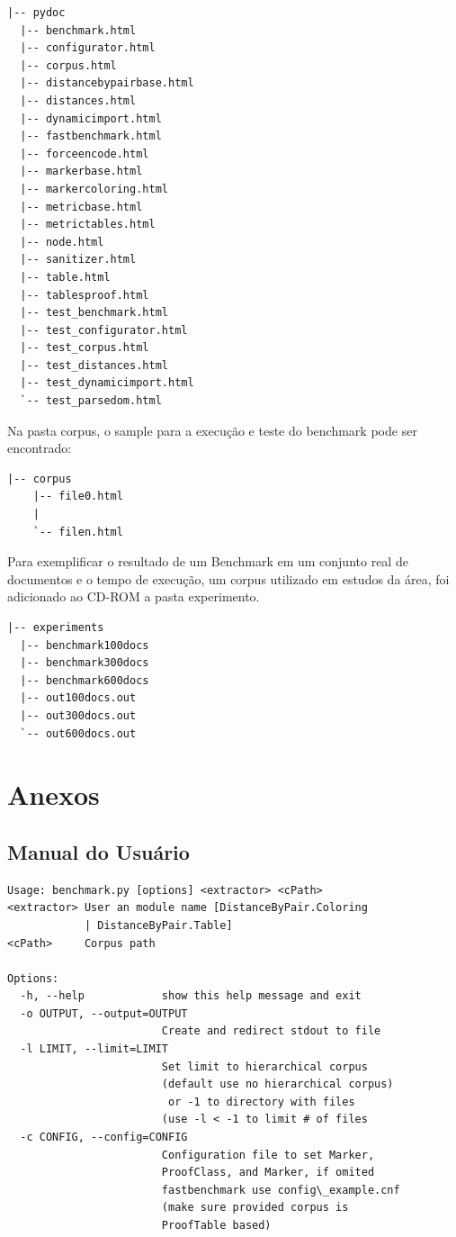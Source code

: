 \documentclass[12pt, a4paper]{article}
\begin{document}
\begin{verbatim}
|-- pydoc
  |-- benchmark.html
  |-- configurator.html
  |-- corpus.html
  |-- distancebypairbase.html
  |-- distances.html
  |-- dynamicimport.html
  |-- fastbenchmark.html
  |-- forceencode.html
  |-- markerbase.html
  |-- markercoloring.html
  |-- metricbase.html
  |-- metrictables.html
  |-- node.html
  |-- sanitizer.html
  |-- table.html
  |-- tablesproof.html
  |-- test_benchmark.html
  |-- test_configurator.html
  |-- test_corpus.html
  |-- test_distances.html
  |-- test_dynamicimport.html
  `-- test_parsedom.html

\end{verbatim}

Na pasta corpus, o sample para a execução e teste do benchmark pode ser
encontrado:

\begin{verbatim}
|-- corpus
    |-- file0.html 
    |
    `-- filen.html
\end{verbatim}

Para exemplificar o resultado de um Benchmark em um conjunto real de
documentos e o tempo de execução, um corpus utilizado em estudos da área,
foi adicionado ao CD-ROM a pasta experimento.

\begin{verbatim}
|-- experiments
  |-- benchmark100docs
  |-- benchmark300docs
  |-- benchmark600docs
  |-- out100docs.out
  |-- out300docs.out
  `-- out600docs.out
\end{verbatim}

\appendix

\section{Anexos}
\subsection{Manual do Usuário}
\label{userdoc}

\begin{verbatim}
Usage: benchmark.py [options] <extractor> <cPath>
<extractor> User an module name [DistanceByPair.Coloring
            | DistanceByPair.Table]
<cPath>     Corpus path 

Options:
  -h, --help            show this help message and exit
  -o OUTPUT, --output=OUTPUT
                        Create and redirect stdout to file
  -l LIMIT, --limit=LIMIT
                        Set limit to hierarchical corpus 
                        (default use no hierarchical corpus)
                         or -1 to directory with files
                        (use -l < -1 to limit # of files
  -c CONFIG, --config=CONFIG
                        Configuration file to set Marker, 
                        ProofClass, and Marker, if omited
                        fastbenchmark use config\_example.cnf
                        (make sure provided corpus is
                        ProofTable based)

\end{verbatim}
\end{document}

